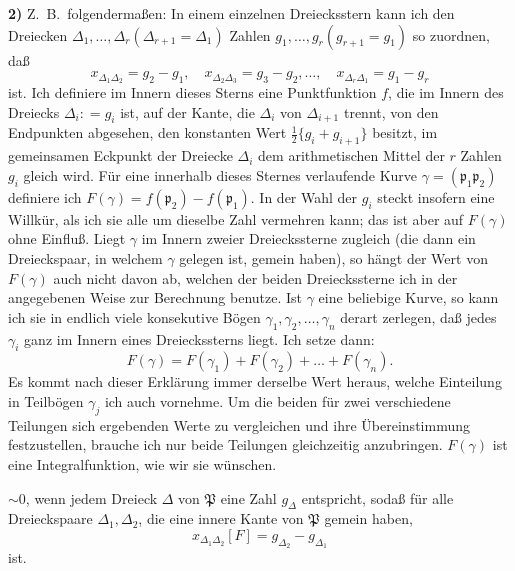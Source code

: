 \documentclass{article}
\begin{document}
\textbf{2)} Z.~B.\ folgendermaßen: In einem einzelnen Dreiecksstern kann ich den Dreiecken $\Delta_1, \dots, \Delta_r (\Delta_{r+1} = \Delta_1)$ Zahlen $g_1, \dots, g_r (g_{r+1} = g_1)$ so zuordnen, daß
\[ x_{\Delta_1 \Delta_2} = g_2 - g_1, \quad x_{\Delta_2 \Delta_3} = g_3 - g_2, \dots, \quad x_{\Delta_r \Delta_1} = g_1 - g_r \]
ist. Ich definiere im Innern dieses Sterns eine Punktfunktion $f$, die im Innern des Dreiecks $\Delta_i\colon = g_i$ ist, auf der Kante, die $\Delta_i$ von $\Delta_{i+1}$ trennt, von den Endpunkten abgesehen, den konstanten Wert $\frac{1}{2} \{g_i + g_{i+1}\}$ besitzt, im gemeinsamen Eckpunkt der Dreiecke $\Delta_i$ dem arithmetischen Mittel der $r$ Zahlen $g_i$ gleich wird. Für eine innerhalb dieses Sternes verlaufende Kurve $\gamma = (\mathfrak{p}_1 \mathfrak{p}_2)$ definiere ich $F(\gamma) = f(\mathfrak{p}_2) - f(\mathfrak{p}_1)$. In der Wahl der $g_i$ steckt insofern eine Willkür, als ich sie alle um dieselbe Zahl vermehren kann; das ist aber auf $F(\gamma)$ ohne Einfluß. Liegt $\gamma$ im Innern zweier Dreieckssterne zugleich (die dann ein Dreieckspaar, in welchem $\gamma$ gelegen ist, gemein haben), so hängt der Wert von $F(\gamma)$ auch nicht davon ab, welchen der beiden Dreieckssterne ich in der angegebenen Weise zur Berechnung benutze. Ist $\gamma$ eine beliebige Kurve, so kann ich sie in endlich viele konsekutive Bögen $\gamma_1, \gamma_2, \dots, \gamma_n$ derart zerlegen, daß jedes $\gamma_i$ ganz im Innern eines Dreieckssterns liegt. Ich setze dann:
\[ F(\gamma) = F(\gamma_1) + F(\gamma_2) + \dots + F(\gamma_n). \]
Es kommt nach dieser Erklärung immer derselbe Wert heraus, welche Einteilung in Teilbögen $\gamma_j$ ich auch vornehme. Um die beiden für zwei verschiedene Teilungen sich ergebenden Werte zu vergleichen und ihre Übereinstimmung festzustellen, brauche ich nur beide Teilungen gleichzeitig anzubringen. $F(\gamma)$ ist eine Integralfunktion, wie wir sie wünschen.

$\sim 0$, wenn jedem Dreieck $\Delta$ von $\mathfrak{P}$ eine Zahl $g_\Delta$ entspricht, sodaß für alle Dreieckspaare $\Delta_1, \Delta_2$, die eine innere Kante von $\mathfrak{P}$ gemein haben,
\[ x_{\Delta_1 \Delta_2} [F] = g_{\Delta_2} - g_{\Delta_1} \]
ist.
\end{document}
